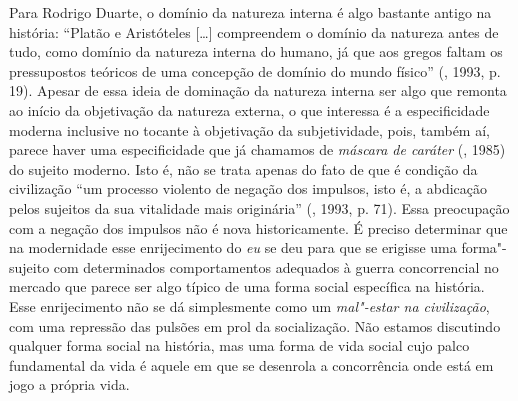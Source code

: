 Para Rodrigo Duarte, o domínio da natureza interna é algo bastante
antigo na história: ``Platão e Aristóteles [\ldots{}] compreendem o
domínio da natureza antes de tudo, como domínio da natureza interna do
humano, já que aos gregos faltam os pressupostos teóricos de uma
concepção de domínio do mundo físico'' (, 1993, p. 19). Apesar de
essa ideia de dominação da natureza interna ser algo que remonta ao
início da objetivação da natureza externa, o que interessa é
a especificidade moderna inclusive no tocante à
objetivação da subjetividade, pois, também aí, parece haver uma
especificidade que já chamamos de \emph{máscara de caráter} (, 1985)
do sujeito moderno. Isto é, não se trata apenas do fato de que é
condição da civilização ``um processo violento de negação dos impulsos,
isto é, a abdicação pelos sujeitos da sua vitalidade mais originária''
(, 1993, p. 71). Essa preocupação com a negação dos impulsos não
é nova historicamente. É preciso determinar que na modernidade esse
enrijecimento do \emph{eu} se deu para que se erigisse uma forma"-sujeito
com determinados comportamentos adequados à guerra concorrencial no
mercado que parece ser algo típico de uma forma social específica na
história. Esse enrijecimento não se dá simplesmente como um
\emph{mal"-estar na civilização}, com uma repressão das pulsões em prol
da socialização. Não estamos discutindo qualquer forma social na
história, mas uma forma de vida social cujo palco fundamental da vida é
aquele em que se desenrola a concorrência onde está em jogo a própria
vida.

